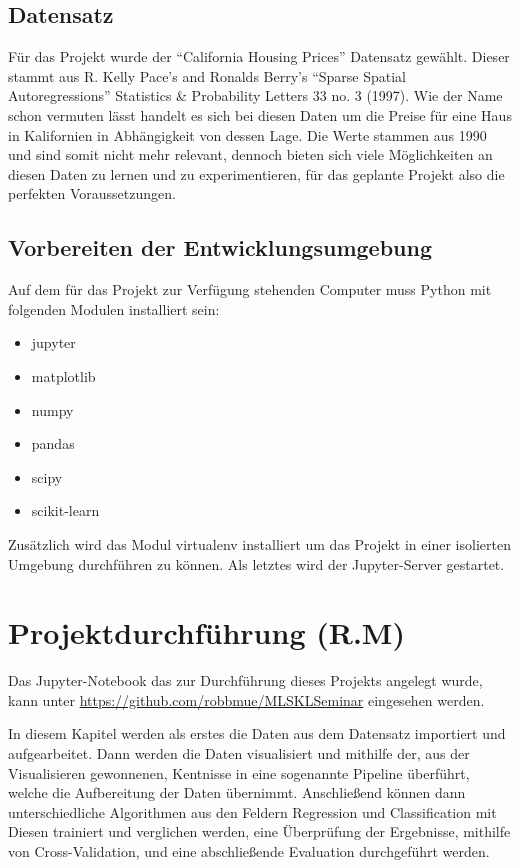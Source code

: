 \section{Datensatz}
\label{sec:datensatz}
Für das Projekt wurde der “California Housing Prices” Datensatz gewählt. Dieser stammt aus R. Kelly Pace’s and Ronalds Berry’s “Sparse Spatial Autoregressions” Statistics \& Probability Letters 33 no. 3 (1997). Wie der Name schon vermuten lässt handelt es sich bei diesen Daten um die Preise für eine Haus in Kalifornien in Abhängigkeit von dessen Lage. Die Werte stammen aus 1990  und sind somit nicht mehr relevant, dennoch bieten sich viele Möglichkeiten an diesen Daten zu lernen und zu experimentieren, für das geplante Projekt also die perfekten Voraussetzungen.

\section{Vorbereiten der Entwicklungsumgebung}
\label{sec:vorbereitenEntwicklungsumgebung}
Auf dem für das Projekt zur Verfügung stehenden Computer muss Python mit folgenden Modulen installiert sein: 
\begin{itemize}
\item jupyter
\item matplotlib
\item numpy
\item pandas
\item scipy
\item scikit-learn
\end{itemize}
Zusätzlich wird das Modul virtualenv installiert um das Projekt in einer isolierten Umgebung durchführen zu können. Als letztes wird der Jupyter-Server gestartet.

\chapter{Projektdurchführung (R.M)}
\label{chap:projektdurchführung}
Das Jupyter-Notebook das zur Durchführung dieses Projekts angelegt wurde, kann unter \href{https://github.com/robbmue/MLSKLSeminar}{https://github.com/robbmue/MLSKLSeminar} eingesehen werden.

In diesem Kapitel werden als erstes die Daten aus dem Datensatz importiert und aufgearbeitet. Dann werden die Daten visualisiert und mithilfe der, aus der Visualisieren gewonnenen, Kentnisse in eine sogenannte Pipeline überführt, welche die Aufbereitung der Daten übernimmt.
Anschließend können dann unterschiedliche Algorithmen aus den Feldern Regression und Classification mit Diesen trainiert und verglichen werden, eine Überprüfung der Ergebnisse, mithilfe von Cross-Validation, und eine abschließende Evaluation durchgeführt werden.

